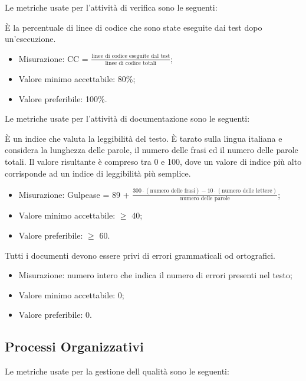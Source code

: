 	Le metriche usate per l'attività di verifica sono le seguenti:
	
		 È la percentuale di linee di codice che sono state eseguite dai test dopo un’esecuzione.
		 \begin{itemize}
			\item{Misurazione: CC = $\displaystyle\frac{\mbox{linee di codice eseguite dal test}}{\mbox{linee di codice totali}}$;}
			\item{Valore minimo accettabile: 80\%;}
			\item{Valore preferibile: 100\%.}
		\end{itemize}
	
	Le metriche usate per l'attività di documentazione sono le seguenti:
	
		È un indice che valuta la leggibilità del testo. È tarato sulla lingua italiana e considera la lunghezza delle parole, il numero delle frasi ed il numero delle parole totali. Il valore risultante è compreso tra 0 e 100, dove un valore di indice più alto corrisponde ad un indice di leggibilità più semplice.
		 \begin{itemize}
			\item{Misurazione: Gulpease = 89 + $\displaystyle\frac{300 \cdot{} (\mbox{numero delle frasi}) - 10 \cdot{} (\mbox{numero delle lettere})}{\mbox{numero delle parole}}$;}
			\item{Valore minimo accettabile: $\geq$ 40;}
			\item{Valore preferibile: $\geq$ 60.}
		\end{itemize}

		Tutti i documenti devono essere privi di errori grammaticali od ortografici.
		\begin{itemize}
			\item{Misurazione: numero intero che indica il numero di errori presenti nel testo;}
			\item{Valore minimo accettabile: 0;}
			\item{Valore preferibile: 0.}
		\end{itemize}

\subsection{Processi Organizzativi}

	Le metriche usate per la gestione dell qualità sono le seguenti:
	

